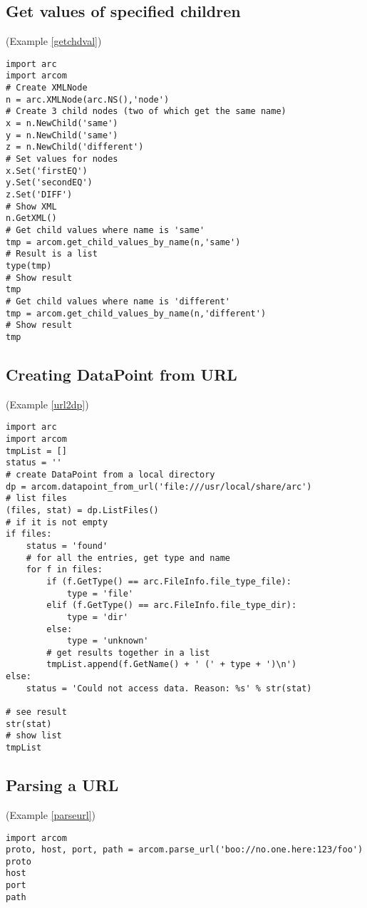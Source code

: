 \subsection{Get values of specified children}
(Example \ref{getchdval})
\label{cgetchdval}
\begin{verbatim}
import arc
import arcom
# Create XMLNode
n = arc.XMLNode(arc.NS(),'node')
# Create 3 child nodes (two of which get the same name)
x = n.NewChild('same')
y = n.NewChild('same')
z = n.NewChild('different')
# Set values for nodes
x.Set('firstEQ')
y.Set('secondEQ')
z.Set('DIFF')
# Show XML
n.GetXML()
# Get child values where name is 'same'
tmp = arcom.get_child_values_by_name(n,'same')
# Result is a list
type(tmp)
# Show result
tmp
# Get child values where name is 'different'
tmp = arcom.get_child_values_by_name(n,'different')
# Show result
tmp
\end{verbatim}

\subsection{Creating DataPoint from URL}
(Example \ref{url2dp})
\label{curl2dp}
\begin{verbatim}
import arc
import arcom
tmpList = []
status = ''
# create DataPoint from a local directory
dp = arcom.datapoint_from_url('file:///usr/local/share/arc')
# list files
(files, stat) = dp.ListFiles()
# if it is not empty
if files:
    status = 'found'
    # for all the entries, get type and name
    for f in files:
        if (f.GetType() == arc.FileInfo.file_type_file):
            type = 'file'
        elif (f.GetType() == arc.FileInfo.file_type_dir):
            type = 'dir'
        else:
            type = 'unknown'
        # get results together in a list
        tmpList.append(f.GetName() + ' (' + type + ')\n')
else:
    status = 'Could not access data. Reason: %s' % str(stat)

# see result
str(stat)
# show list
tmpList
\end{verbatim}

\subsection{Parsing a URL}
(Example \ref{parseurl})
\label{cparseurl}
\begin{verbatim}
import arcom
proto, host, port, path = arcom.parse_url('boo://no.one.here:123/foo')
proto
host
port
path
\end{verbatim}

